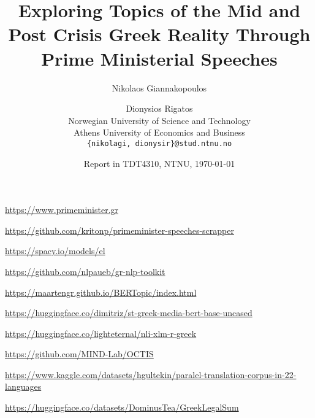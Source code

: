 \documentclass[11pt]{article}
\title{Exploring Topics of the Mid and Post Crisis Greek Reality Through Prime Ministerial Speeches }
\author{
  Nikolaos Giannakopoulos \and Dionysios Rigatos\\
  Norwegian University of Science and Technology \\
  Athens University of Economics and Business \\
  {\tt \{nikolagi, dionysir\}@stud.ntnu.no}}
\date{Report in TDT4310, NTNU, \today}
\begin{document}
\maketitle








\begin{thebibliography}{9}
 \url{https://www.primeminister.gr}

 \url{https://github.com/kritonp/primeminister-speeches-scrapper}

 \url{https://spacy.io/models/el}

 \url{https://github.com/nlpaueb/gr-nlp-toolkit}

 \url{https://maartengr.github.io/BERTopic/index.html}

 \url{https://huggingface.co/dimitriz/st-greek-media-bert-base-uncased}

  \url{https://huggingface.co/lighteternal/nli-xlm-r-greek}

 \url{https://github.com/MIND-Lab/OCTIS}

 \url{ https://www.kaggle.com/datasets/hgultekin/paralel-translation-corpus-in-22-languages}

 \url{https://huggingface.co/datasets/DominusTea/GreekLegalSum}

\end{thebibliography}
\end{document}
